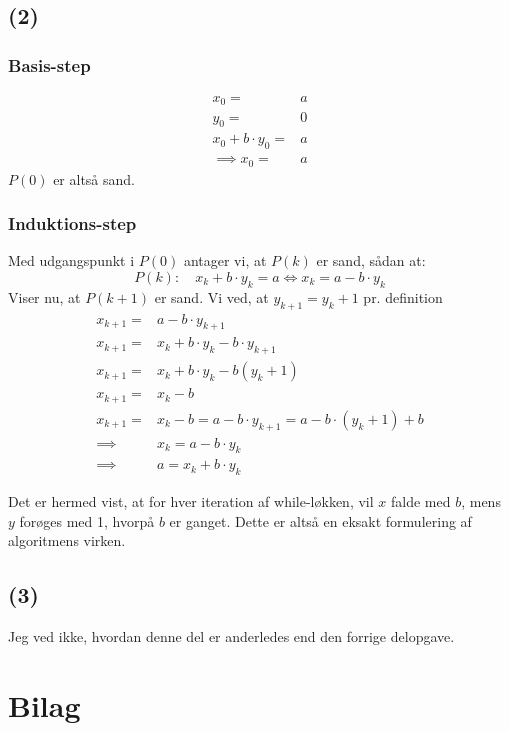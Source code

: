 \documentclass[a4paper,10pt]{article}
\begin{document}
\subsection*{(2)}
\subsubsection*{Basis-step}
\begin{equation}
\begin{aligned}	
x_{0} 					= & a \\
y_{0}					= & 0 \\
x_{0} +b\cdot y_{0} 	= & a \\
\implies x_{0} 			= & a
\end{aligned}
\end{equation}
$P(0)$ er altså sand. 

\subsubsection*{Induktions-step}
Med udgangspunkt i $P(0)$ antager vi, at $P(k)$ er sand, sådan at:
$$
P(k): \quad x_{k} + b \cdot y_{k} = a \iff x_{k} = a - b \cdot y_{k}
$$
Viser nu, at $P(k+1)$ er sand. Vi ved, at $y_{k+1} = y_{k} + 1$ pr. definition
\begin{equation}
\begin{aligned}	
x_{k+1} = & a - b \cdot y_{k+1} \\
x_{k+1} = & x_{k} + b \cdot y_{k} - b \cdot y_{k+1} \\
x_{k+1} = & x_{k} + b \cdot y_{k} - b(y_{k} + 1) \\
x_{k+1} = & x_{k} - b \\
x_{k+1} = & x_{k} - b = a - b \cdot y_{k+1} = a - b \cdot (y_{k} + 1) + b \\
\implies  & x_{k} = a - b \cdot y_{k} \\
\implies  & a = x_{k} + b\cdot y_{k}
\end{aligned}
\end{equation}

Det er hermed vist, at for hver iteration af while-løkken, vil $x$ falde med $b$, mens $y$ forøges med 1, hvorpå $b$ er ganget. Dette er altså en eksakt formulering af algoritmens virken. 

\subsection*{(3)}

Jeg ved ikke, hvordan denne del er anderledes end den forrige delopgave. 

\newpage

\section*{Bilag}

\end{document}
